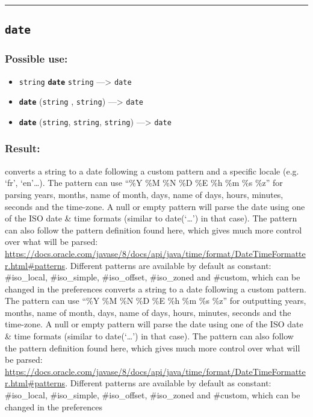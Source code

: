 \documentclass[]{book}
\providecommand{\tightlist}{%
  \setlength{\itemsep}{0pt}\setlength{\parskip}{0pt}}
\theoremstyle{definition}
\theoremstyle{definition}
\theoremstyle{definition}
\theoremstyle{remark}
\begin{document}
\begin{center}\rule{0.5\linewidth}{\linethickness}\end{center}

\subsection{\texorpdfstring{\texttt{date}}{date}}\label{date}

\subsubsection{Possible use:}\label{possible-use-124}

\begin{itemize}
\tightlist
\item
  \texttt{string} \textbf{\texttt{date}} \texttt{string}
  ---\textgreater{} \texttt{date}
\item
  \textbf{\texttt{date}} (\texttt{string} , \texttt{string})
  ---\textgreater{} \texttt{date}
\item
  \textbf{\texttt{date}} (\texttt{string}, \texttt{string},
  \texttt{string}) ---\textgreater{} \texttt{date}
\end{itemize}

\subsubsection{Result:}\label{result-120}

converts a string to a date following a custom pattern and a specific
locale (e.g. `fr', `en'\ldots{}). The pattern can use ``\%Y \%M \%N \%D
\%E \%h \%m \%s \%z'' for parsing years, months, name of month, days,
name of days, hours, minutes, seconds and the time-zone. A null or empty
pattern will parse the date using one of the ISO date \& time formats
(similar to date(`\ldots{}') in that case). The pattern can also follow
the pattern definition found here, which gives much more control over
what will be parsed:
\url{https://docs.oracle.com/javase/8/docs/api/java/time/format/DateTimeFormatter.html\#patterns}.
Different patterns are available by default as constant: \#iso\_local,
\#iso\_simple, \#iso\_offset, \#iso\_zoned and \#custom, which can be
changed in the preferences converts a string to a date following a
custom pattern. The pattern can use ``\%Y \%M \%N \%D \%E \%h \%m \%s
\%z'' for outputting years, months, name of month, days, name of days,
hours, minutes, seconds and the time-zone. A null or empty pattern will
parse the date using one of the ISO date \& time formats (similar to
date(`\ldots{}') in that case). The pattern can also follow the pattern
definition found here, which gives much more control over what will be
parsed:
\url{https://docs.oracle.com/javase/8/docs/api/java/time/format/DateTimeFormatter.html\#patterns}.
Different patterns are available by default as constant: \#iso\_local,
\#iso\_simple, \#iso\_offset, \#iso\_zoned and \#custom, which can be
changed in the preferences
\end{document}

